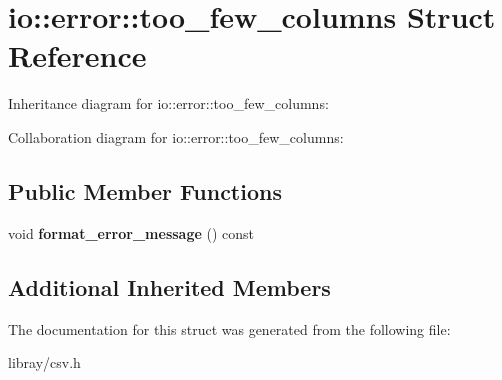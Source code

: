 \hypertarget{structio_1_1error_1_1too__few__columns}{}\section{io\+:\+:error\+:\+:too\+\_\+few\+\_\+columns Struct Reference}
\label{structio_1_1error_1_1too__few__columns}


Inheritance diagram for io\+:\+:error\+:\+:too\+\_\+few\+\_\+columns\+:


Collaboration diagram for io\+:\+:error\+:\+:too\+\_\+few\+\_\+columns\+:
\subsection*{Public Member Functions}
\begin{DoxyCompactItemize}
\item 
\mbox{\label{structio_1_1error_1_1too__few__columns_a58d6d1fada127120facbcc00851ab455}} 
void {\bfseries format\+\_\+error\+\_\+message} () const
\end{DoxyCompactItemize}
\subsection*{Additional Inherited Members}


The documentation for this struct was generated from the following file\+:\begin{DoxyCompactItemize}
\item 
libray/csv.\+h\end{DoxyCompactItemize}
